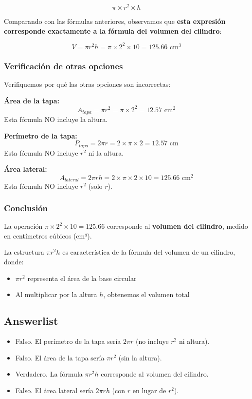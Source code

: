 \documentclass[
]{article}
\providecommand{\tightlist}{%
  \setlength{\itemsep}{0pt}\setlength{\parskip}{0pt}}
\begin{document}
\[\pi \times r^2 \times h\]

Comparando con las fórmulas anteriores, observamos que \textbf{esta
expresión corresponde exactamente a la fórmula del volumen del
cilindro}:

\[V = \pi r^2 h = \pi \times 2^2 \times 10 = 125.66 \text{ cm}^3\]

\subsubsection{Verificación de otras
opciones}\label{verificaciuxf3n-de-otras-opciones}

Verifiquemos por qué las otras opciones son incorrectas:

\textbf{Área de la tapa:}
\[A_{tapa} = \pi r^2 = \pi \times  2 ^2 =  12.57  \text{ cm}^2\] Esta
fórmula NO incluye la altura.

\textbf{Perímetro de la tapa:}
\[P_{tapa} = 2\pi r = 2 \times \pi \times  2  =  12.57  \text{ cm}\]
Esta fórmula NO incluye \(r^2\) ni la altura.

\textbf{Área lateral:}
\[A_{lateral} = 2\pi r h = 2 \times \pi \times  2  \times  10  =  125.66  \text{ cm}^2\]
Esta fórmula NO incluye \(r^2\) (solo \(r\)).

\subsubsection{Conclusión}\label{conclusiuxf3n}

La operación \(\pi \times 2^2 \times 10 = 125.66\) corresponde al
\textbf{volumen del cilindro}, medido en centímetros cúbicos (cm³).

La estructura \(\pi r^2 h\) es característica de la fórmula del volumen
de un cilindro, donde:

\begin{itemize}
\tightlist
\item
  \(\pi r^2\) representa el área de la base circular
\item
  Al multiplicar por la altura \(h\), obtenemos el volumen total
\end{itemize}

\subsection{Answerlist}\label{answerlist-1}

\begin{itemize}
\tightlist
\item
  Falso. El perímetro de la tapa sería \(2\pi r\) (no incluye \(r^2\) ni
  altura).
\item
  Falso. El área de la tapa sería \(\pi r^2\) (sin la altura).
\item
  Verdadero. La fórmula \(\pi r^2 h\) corresponde al volumen del
  cilindro.
\item
  Falso. El área lateral sería \(2\pi r h\) (con \(r\) en lugar de
  \(r^2\)).
\end{itemize}
\end{document}
